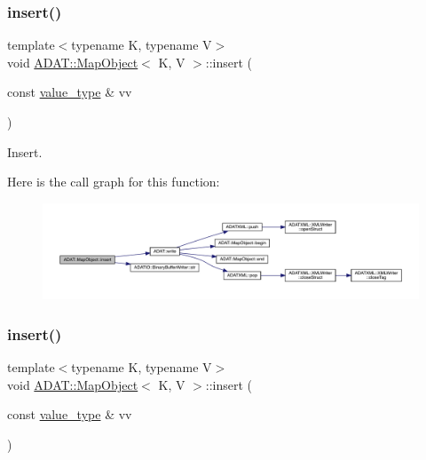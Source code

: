\subsubsection{\texorpdfstring{insert()}{insert()}\hspace{0.1cm}{\footnotesize\ttfamily [8/9]}}
{\footnotesize\ttfamily template$<$typename K, typename V$>$ \\
void \mbox{\hyperlink{classADAT_1_1MapObject}{A\+D\+A\+T\+::\+Map\+Object}}$<$ K, V $>$\+::insert (\begin{DoxyParamCaption}\item[{const \mbox{\hyperlink{classADAT_1_1MapObject_ad985e6ff5b35a72c79d4b466d316cc0a}{value\+\_\+type}} \&}]{vv }\end{DoxyParamCaption})\hspace{0.3cm}{\ttfamily [inline]}}



Insert. 

Here is the call graph for this function\+:
\nopagebreak
\begin{figure}[H]
\begin{center}
\leavevmode
\includegraphics[width=350pt]{da/d29/classADAT_1_1MapObject_aaa819ee6219acf8f74c39563c9c68ab4_cgraph}
\end{center}
\end{figure}
\mbox{\label{classADAT_1_1MapObject_aaa819ee6219acf8f74c39563c9c68ab4}} 
\subsubsection{\texorpdfstring{insert()}{insert()}\hspace{0.1cm}{\footnotesize\ttfamily [9/9]}}
{\footnotesize\ttfamily template$<$typename K, typename V$>$ \\
void \mbox{\hyperlink{classADAT_1_1MapObject}{A\+D\+A\+T\+::\+Map\+Object}}$<$ K, V $>$\+::insert (\begin{DoxyParamCaption}\item[{const \mbox{\hyperlink{classADAT_1_1MapObject_ad985e6ff5b35a72c79d4b466d316cc0a}{value\+\_\+type}} \&}]{vv }\end{DoxyParamCaption})\hspace{0.3cm}{\ttfamily [inline]}}



